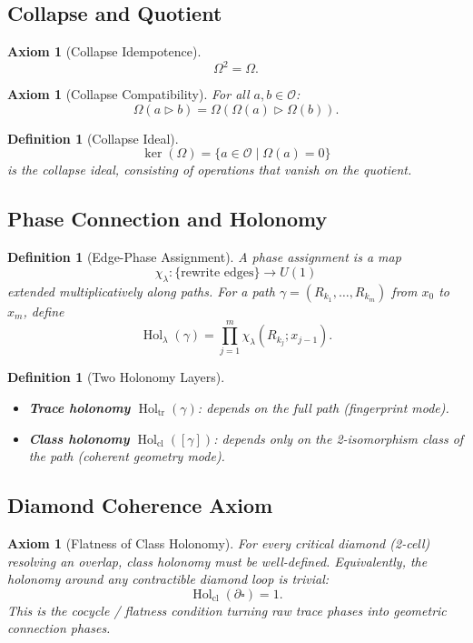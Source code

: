 \documentclass[12pt, oneside]{article}
\newtheorem{definition}[theorem]{Definition}
\newtheorem{axiom}[theorem]{Axiom}
\DeclareMathOperator{\tr}{tr}
\DeclareMathOperator{\Hol}{Hol}
\newcommand{\cl}{\mathrm{cl}}
\begin{document}
\subsection{Collapse and Quotient}

\begin{axiom}[Collapse Idempotence]
\[
\Omega^2 = \Omega.
\]
\end{axiom}

\begin{axiom}[Collapse Compatibility]
For all $a,b \in \mathcal{O}$:
\[
\Omega(a \triangleright b) = \Omega(\Omega(a) \triangleright \Omega(b)).
\]
\end{axiom}

\begin{definition}[Collapse Ideal]
\[
\ker(\Omega) = \{ a \in \mathcal{O} \mid \Omega(a) = 0 \}
\]
is the collapse ideal, consisting of operations that vanish on the quotient.
\end{definition}

\subsection{Phase Connection and Holonomy}

\begin{definition}[Edge-Phase Assignment]
A phase assignment is a map
\[
\chi_\lambda: \{\text{rewrite edges}\} \to U(1)
\]
extended multiplicatively along paths. For a path $\gamma = (R_{k_1}, \dots, R_{k_m})$ from $x_0$ to $x_m$, define
\[
\Hol_{\lambda}(\gamma) = \prod_{j=1}^m \chi_\lambda(R_{k_j}; x_{j-1}).
\]
\end{definition}

\begin{definition}[Two Holonomy Layers]
\begin{itemize}
    \item \textbf{Trace holonomy} \( \Hol_{\tr}(\gamma) \): depends on the full path (fingerprint mode).
    \item \textbf{Class holonomy} \( \Hol_{\cl}([\gamma]) \): depends only on the 2-isomorphism class of the path (coherent geometry mode).
\end{itemize}
\end{definition}

\subsection{Diamond Coherence Axiom}

\begin{axiom}[Flatness of Class Holonomy]
For every critical diamond (2-cell) resolving an overlap, class holonomy must be well-defined. Equivalently, the holonomy around any contractible diamond loop is trivial:
\[
\Hol_{\cl}(\partial \square) = 1.
\]
This is the cocycle / flatness condition turning raw trace phases into geometric connection phases.
\end{axiom}
\end{document}
